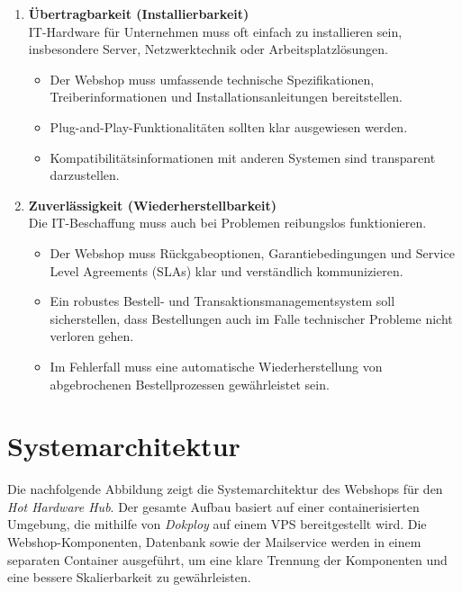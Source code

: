 \documentclass[%
	12pt,
	a4paper,
	oneside,
	parskip=full
]{scrbook}
\begin{document}
\begin{enumerate}
	\item \textbf{Übertragbarkeit (Installierbarkeit)} \\
	IT-Hardware für Unternehmen muss oft einfach zu installieren sein, insbesondere Server, Netzwerktechnik oder Arbeitsplatzlösungen.
	\begin{itemize}
		\item Der Webshop muss umfassende technische Spezifikationen, Treiberinformationen und Installationsanleitungen bereitstellen.
		\item Plug-and-Play-Funktionalitäten sollten klar ausgewiesen werden.
		\item Kompatibilitätsinformationen mit anderen Systemen sind transparent darzustellen.
	\end{itemize}
	
	\item \textbf{Zuverlässigkeit (Wiederherstellbarkeit)} \\
	Die IT-Beschaffung muss auch bei Problemen reibungslos funktionieren.
	\begin{itemize}
		\item Der Webshop muss Rückgabeoptionen, Garantiebedingungen und \textenglish{Service Level Agreements} (SLAs) klar und verständlich kommunizieren.
		\item Ein robustes Bestell- und Transaktionsmanagementsystem soll sicherstellen, dass Bestellungen auch im Falle technischer Probleme nicht verloren gehen.
		\item Im Fehlerfall muss eine automatische Wiederherstellung von abgebrochenen Bestellprozessen gewährleistet sein.  
	\end{itemize}
\end{enumerate}

\chapter{Systemarchitektur}
Die nachfolgende Abbildung zeigt die Systemarchitektur des Webshops für den \textit{Hot Hardware Hub}. Der gesamte Aufbau basiert auf einer containerisierten Umgebung, die mithilfe von \textit{Dokploy} auf einem VPS bereitgestellt wird. Die Webshop-Komponenten, Datenbank sowie der Mailservice werden in einem separaten Container ausgeführt, um eine klare Trennung der Komponenten und eine bessere Skalierbarkeit zu gewährleisten.
\end{document}
